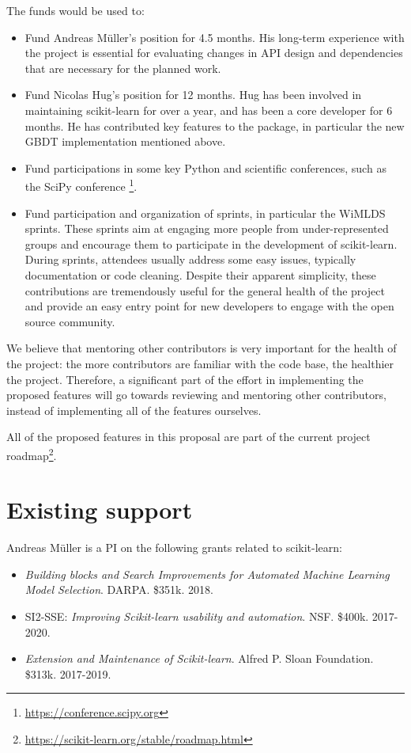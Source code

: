 \documentclass[11pt]{article}  %
\begin{document}
The funds would be used to:
\begin{itemize}
\item Fund Andreas M\"uller's position for 4.5 months. His long-term experience with the project is essential for evaluating changes in API design and dependencies that are necessary for the planned work.
\item Fund Nicolas Hug's position for 12 months. Hug has been involved in
maintaining scikit-learn for over a year, and has been a core developer for 6 months. He has contributed key features
to the package, in particular the new GBDT implementation mentioned above.
\item Fund participations in some key Python and scientific conferences,
such as the SciPy conference
\footnote{\href{https://conference.scipy.org/}{https://conference.scipy.org}}.
\item Fund participation and organization of sprints, in particular the WiMLDS sprints. These
sprints aim at engaging more people from under-represented groups and
encourage them to participate in the development of scikit-learn. During sprints, attendees usually address some easy issues, typically
documentation or code cleaning. Despite their apparent simplicity, these
contributions are tremendously useful for the general health of the project
and provide an easy entry point for new developers to engage with the open
source community.
\end{itemize}

We believe that mentoring other contributors is very important for the
health of the project: the more contributors are familiar with the code
base, the healthier the project. Therefore, a significant part of the effort in
implementing the proposed features will go towards reviewing and
mentoring other contributors, instead of implementing all of the features
ourselves.

All of the proposed features in this proposal are part of the current
project
roadmap\footnote{\href{https://scikit-learn.org/stable/roadmap.html}{https://scikit-learn.org/stable/roadmap.html}}.


\section{Existing support}

 Andreas M\"uller is a PI on the following grants related to scikit-learn:

\begin{itemize}
    \item \textit{Building blocks and Search Improvements for Automated Machine Learning Model Selection}. DARPA. \$351k.  2018.
    \item SI2-SSE: \textit{Improving Scikit-learn usability and automation}. NSF. \$400k.  2017-2020.
    \item \textit{Extension and Maintenance of Scikit-learn}. Alfred P. Sloan Foundation. \$313k.  2017-2019.
\end{itemize}
\end{document}
